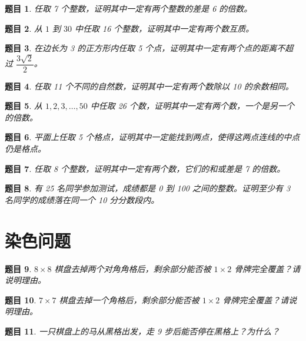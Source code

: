 \documentclass[11pt,a4paper,fontset=fandol]{ctexart}
\theoremstyle{formalexample}
\newtheorem{exercise}{题目}[section]
\begin{document}
\begin{exercise}
任取 7 个整数，证明其中一定有两个整数的差是 6 的倍数。
\end{exercise}

\begin{exercise}
从 $1$ 到 $30$ 中任取 16 个整数，证明其中一定有两个数互质。
\end{exercise}

\begin{exercise}
在边长为 3 的正方形内任取 5 个点，证明其中一定有两个点的距离不超过 $\dfrac{3\sqrt{2}}{2}$。
\end{exercise}

\begin{exercise}
任取 11 个不同的自然数，证明其中一定有两个数除以 10 的余数相同。
\end{exercise}

\begin{exercise}
从 $1,2,3,\ldots,50$ 中任取 26 个数，证明其中一定有两个数，一个是另一个的倍数。
\end{exercise}

\begin{exercise}
平面上任取 5 个格点，证明其中一定能找到两点，使得这两点连线的中点仍是格点。
\end{exercise}

\begin{exercise}
任取 8 个整数，证明其中一定有两个数，它们的和或差是 7 的倍数。
\end{exercise}

\begin{exercise}
有 25 名同学参加测试，成绩都是 0 到 100 之间的整数。证明至少有 3 名同学的成绩落在同一个 10 分分数段内。
\end{exercise}

\section{染色问题}

\begin{exercise}
$8\times 8$ 棋盘去掉两个对角角格后，剩余部分能否被 $1\times 2$ 骨牌完全覆盖？请说明理由。
\end{exercise}

\begin{exercise}
$7\times 7$ 棋盘去掉一个角格后，剩余部分能否被 $1\times 2$ 骨牌完全覆盖？请说明理由。
\end{exercise}

\begin{exercise}
一只棋盘上的马从黑格出发，走 9 步后能否停在黑格上？为什么？
\end{exercise}
\end{document}

